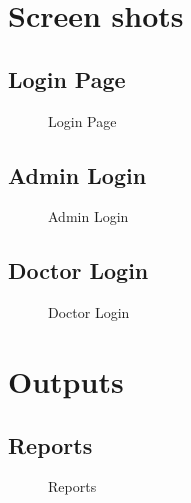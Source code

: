 \documentclass[oneside,a4paper,12pt]{book}
\begin{document}
\section{Screen shots}
\subsection{Login Page}
 \begin{center}
	\begin{figure}[!htbp]
		\centering
	  \caption{Login Page}
	  \label{fig:Login page}
	\end{figure}
\end{center} 
\newpage
\subsection{Admin Login}
 \begin{center}
	\begin{figure}[!htbp]
		\centering
		
	  \caption{Admin Login}
	  \label{fig:Admin Login}
	\end{figure}
\end{center}

\newpage
\subsection{Doctor Login}
 \begin{center}
	\begin{figure}[!htbp]
		\centering
		
	  \caption{Doctor Login}
	  \label{fig:Doctor Login}
	\end{figure}
\end{center}

\newpage
\section{Outputs}
\subsection{Reports}
 \begin{center}
	\begin{figure}[!htbp]
		\centering
		
		
	  \caption{Reports}
	  \label{fig:Reports}
	\end{figure}
\end{center}
\newpage
\end{document}
